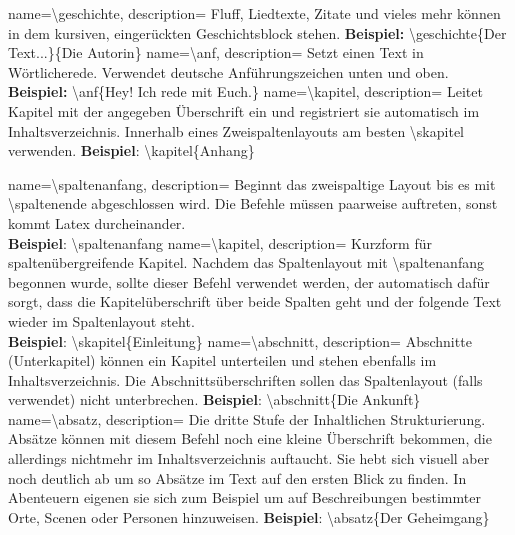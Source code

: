 
{
    name={\textbackslash geschichte},
    description={
            Fluff, Liedtexte, Zitate und vieles mehr können in dem kursiven, eingerückten Geschichtsblock stehen.\newline
            \textbf{Beispiel: }\textbackslash geschichte\{Der Text...\}\{Die Autorin\}
        }
}
{
    name={\textbackslash anf},
    description={
            Setzt einen Text in Wörtlicherede. Verwendet deutsche Anführungszeichen unten und oben.
            \textbf{Beispiel: }\textbackslash anf\{Hey! Ich rede mit Euch.\}
        }
}
{
    name={\textbackslash kapitel},
    description={
            Leitet Kapitel mit der angegeben Überschrift ein und registriert sie automatisch im Inhaltsverzeichnis. Innerhalb eines Zweispaltenlayouts am besten \textbackslash skapitel verwenden.
            \textbf{Beispiel}: \textbackslash kapitel\{Anhang\}}
}

{
    name={\textbackslash spaltenanfang},
    description={
            Beginnt das zweispaltige Layout bis es mit \textbackslash spaltenende abgeschlossen wird. Die Befehle müssen paarweise auftreten, sonst kommt Latex durcheinander.\\
            \textbf{Beispiel}: \textbackslash spaltenanfang}
}
{
    name={\textbackslash kapitel},
    description={
            Kurzform für spaltenübergreifende Kapitel. Nachdem das Spaltenlayout mit \textbackslash spaltenanfang begonnen wurde, sollte dieser Befehl verwendet werden, der automatisch dafür sorgt, dass die Kapitelüberschrift über beide Spalten geht und der folgende Text wieder im Spaltenlayout steht.\\
            \textbf{Beispiel}: \textbackslash skapitel\{Einleitung\}
        }
}
{
    name={\textbackslash abschnitt},
    description={
            Abschnitte (Unterkapitel) können ein Kapitel unterteilen und stehen ebenfalls im Inhaltsverzeichnis. Die Abschnittsüberschriften sollen das Spaltenlayout (falls verwendet) nicht unterbrechen.\newline
            \textbf{Beispiel}: \textbackslash abschnitt\{Die Ankunft\}
        }
}
{
    name={\textbackslash absatz},
    description={
            Die dritte Stufe der Inhaltlichen Strukturierung. Absätze können mit diesem Befehl noch eine kleine Überschrift bekommen, die allerdings nichtmehr im Inhaltsverzeichnis auftaucht. Sie hebt sich visuell aber noch deutlich ab um so Absätze im Text auf den ersten Blick zu finden. In Abenteuern eigenen sie sich zum Beispiel um auf Beschreibungen bestimmter Orte, Scenen oder Personen hinzuweisen.
            \newline
            \textbf{Beispiel}: \textbackslash absatz\{Der Geheimgang\}
        }
}

